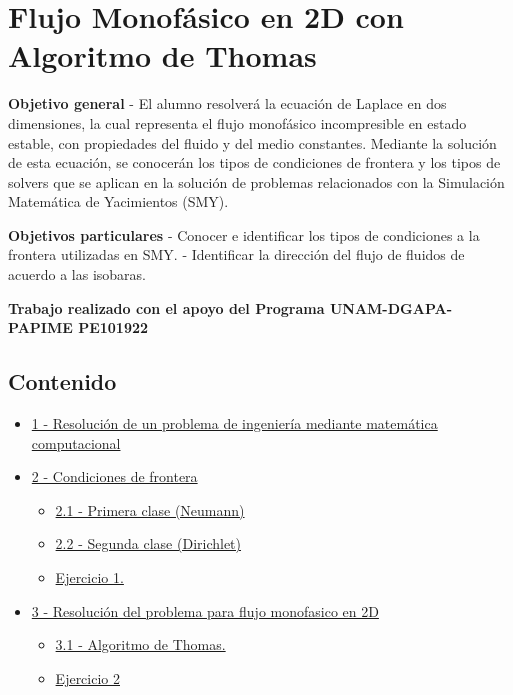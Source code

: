 \documentclass[
  letterpaper,
  DIV=11,
  numbers=noendperiod]{scrreprt}
\providecommand{\tightlist}{%
  \setlength{\itemsep}{0pt}\setlength{\parskip}{0pt}}\usepackage{longtable,booktabs,array}
\begin{document}
\chapter{Flujo Monofásico en 2D con Algoritmo de
Thomas}\label{flujo-monofuxe1sico-en-2d-con-algoritmo-de-thomas}

\textbf{Objetivo general} - El alumno resolverá la ecuación de Laplace
en dos dimensiones, la cual representa el flujo monofásico incompresible
en estado estable, con propiedades del fluido y del medio constantes.
Mediante la solución de esta ecuación, se conocerán los tipos de
condiciones de frontera y los tipos de solvers que se aplican en la
solución de problemas relacionados con la Simulación Matemática de
Yacimientos (SMY).

\textbf{Objetivos particulares} - Conocer e identificar los tipos de
condiciones a la frontera utilizadas en SMY. - Identificar la dirección
del flujo de fluidos de acuerdo a las isobaras.

\textbf{Trabajo realizado con el apoyo del Programa UNAM-DGAPA-PAPIME
PE101922}

\section{Contenido}\label{contenido}

\begin{itemize}
\tightlist
\item
  \hyperref[1]{1 - Resolución de un problema de ingeniería mediante
  matemática computacional}
\item
  \hyperref[2]{2 - Condiciones de frontera}

  \begin{itemize}
  \tightlist
  \item
    \hyperref[2.1]{2.1 - Primera clase (Neumann)}
  \item
    \hyperref[2.2]{2.2 - Segunda clase (Dirichlet)}
  \item
    \hyperref[ej-1]{Ejercicio 1.}
  \end{itemize}
\item
  \hyperref[3]{3 - Resolución del problema para flujo monofasico en 2D}

  \begin{itemize}
  \tightlist
  \item
    \hyperref[3.1]{3.1 - Algoritmo de Thomas.}
  \item
    \hyperref[ej-2]{Ejercicio 2}
  \end{itemize}
\end{itemize}
\end{document}
